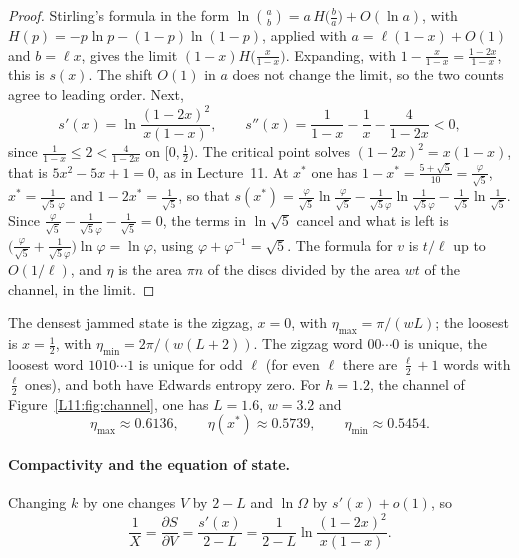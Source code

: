 \begin{proof}
Stirling's formula in the form $\ln\binom ab=a\,H\!\big(\tfrac ba\big)+O(\ln a)$, with
$H(p)=-p\ln p-(1-p)\ln(1-p)$, applied with $a=\ell(1-x)+O(1)$ and $b=\ell x$, gives the limit
$(1-x)H\big(\frac x{1-x}\big)$. Expanding, with $1-\frac x{1-x}=\frac{1-2x}{1-x}$, this is $s(x)$. The
shift $O(1)$ in $a$ does not change the limit, so the two counts agree to leading order. Next,
\[
  s'(x)=\ln\frac{(1-2x)^2}{x(1-x)},\qquad s''(x)=\frac1{1-x}-\frac1x-\frac4{1-2x}<0,
\]
since $\frac1{1-x}\le2<\frac4{1-2x}$ on $[0,\frac12)$. The critical point solves $(1-2x)^2=x(1-x)$, that is
$5x^2-5x+1=0$, as in Lecture~11. At $x^*$ one has $1-x^*=\frac{5+\sqrt5}{10}=\frac{\varphi}{\sqrt5}$,
$x^*=\frac{1}{\sqrt5\,\varphi}$ and $1-2x^*=\frac{1}{\sqrt5}$, so that
$s(x^*)=\frac\varphi{\sqrt5}\ln\frac\varphi{\sqrt5}-\frac1{\sqrt5\varphi}\ln\frac1{\sqrt5\varphi}-\frac1{\sqrt5}\ln\frac1{\sqrt5}$.
Since $\frac\varphi{\sqrt5}-\frac1{\sqrt5\varphi}-\frac1{\sqrt5}=0$, the terms in $\ln\sqrt5$ cancel and what is
left is $\big(\frac\varphi{\sqrt5}+\frac1{\sqrt5\varphi}\big)\ln\varphi=\ln\varphi$, using
$\varphi+\varphi^{-1}=\sqrt5$. The formula for $v$ is $t/\ell$ up to $O(1/\ell)$, and $\eta$ is the area
$\pi n$ of the discs divided by the area $wt$ of the channel, in the limit.
\end{proof}

The densest jammed state is the zigzag, $x=0$, with $\eta_{\max}=\pi/(wL)$; the loosest is
$x=\frac12$, with $\eta_{\min}=2\pi/(w(L+2))$. The zigzag word $00\cdots0$ is unique, the loosest word
$1010\cdots1$ is unique for odd $\ell$ (for even $\ell$ there are $\frac\ell2+1$ words with $\frac\ell2$
ones), and both have Edwards entropy zero. For $h=1.2$, the channel of Figure~\ref{L11:fig:channel}, one has $L=1.6$, $w=3.2$ and
\[
  \eta_{\max}\approx0.6136,\qquad \eta(x^*)\approx0.5739,\qquad \eta_{\min}\approx0.5454 .
\]

\paragraph{Compactivity and the equation of state.} Changing $k$ by one changes $V$ by $2-L$ and $\ln\Omega$
by $s'(x)+o(1)$, so
\begin{equation}\label{SM:eq:compactivity}
  \frac1X=\frac{\partial S}{\partial V}=\frac{s'(x)}{2-L}=\frac1{2-L}\ln\frac{(1-2x)^2}{x(1-x)} .
\end{equation}

